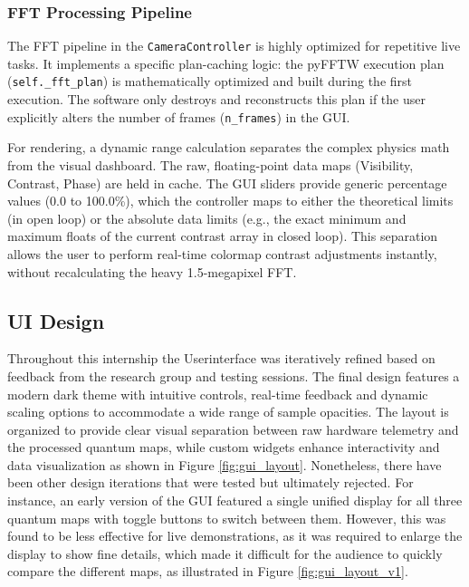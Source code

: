 \documentclass[12pt,a4paper]{article}
\begin{document}
        \subsubsection{FFT Processing Pipeline}
            The \ac{FFT} pipeline in the \texttt{CameraController} is highly optimized for repetitive live tasks. It implements a specific plan-caching logic: the pyFFTW execution plan (\texttt{self.\_fft\_plan}) is mathematically optimized and built during the first execution. The software only destroys and reconstructs this plan if the user explicitly alters the number of frames (\texttt{n\_frames}) in the \ac{GUI}. 
            
            For rendering, a dynamic range calculation separates the complex physics math from the visual dashboard. The raw, floating-point data maps (Visibility, Contrast, Phase) are held in cache. The GUI sliders provide generic percentage values (0.0 to 100.0\%), which the controller maps to either the theoretical limits (in open loop) or the absolute data limits (e.g., the exact minimum and maximum floats of the current contrast array in closed loop). This separation allows the user to perform real-time colormap contrast adjustments instantly, without recalculating the heavy 1.5-megapixel \ac{FFT}.

        \subsection{UI Design}
            Throughout this internship the Userinterface was iteratively refined based on feedback from the research group and testing sessions. The final design features a modern dark theme with intuitive controls, real-time feedback and dynamic scaling options to accommodate a wide range of sample opacities. The layout is organized to provide clear visual separation between raw hardware telemetry and the processed quantum maps, while custom widgets enhance interactivity and data visualization as shown in Figure \ref{fig:gui_layout}.
            Nonetheless, there have been other design iterations that were tested but ultimately rejected. For instance, an early version of the GUI featured a single unified display for all three quantum maps with toggle buttons to switch between them. However, this was found to be less effective for live demonstrations, as it was required to enlarge the display to show fine details, which made it difficult for the audience to quickly compare the different maps, as illustrated in Figure \ref{fig:gui_layout_v1}.
\end{document}
